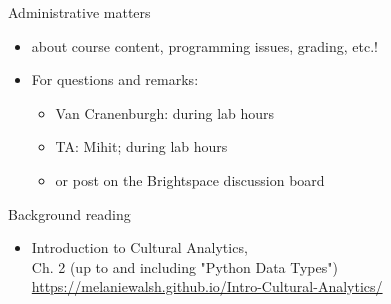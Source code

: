 \documentclass[aspectratio=169,usenames,dvipsnames]{beamer}
\begin{document}
\begin{frame}{Administrative matters}
    \begin{itemize}
        \item {} about course content,
            programming issues, grading, etc.!
        \item For questions and remarks:
            \begin{itemize}
                \item Van Cranenburgh: during lab hours
                \item TA: Mihit; during lab hours
                \item or post on the Brightspace discussion board
            \end{itemize}
    \end{itemize}
\end{frame}


\begin{frame}{Background reading}
    \begin{itemize}
        \item Introduction to Cultural Analytics,\\
            Ch. 2 (up to and including "Python Data Types") \\
            \url{https://melaniewalsh.github.io/Intro-Cultural-Analytics/}
    \end{itemize}
\end{frame}
\end{document}
